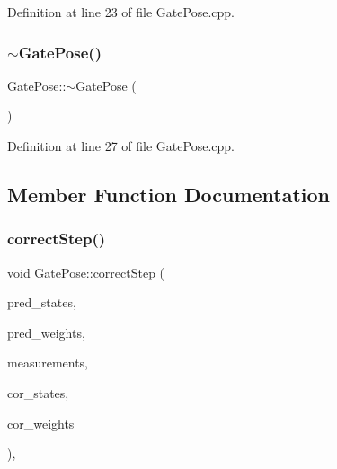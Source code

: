 Definition at line 23 of file Gate\+Pose.\+cpp.

\mbox{\label{classGatePose_acea85773116a379f108b7c53152d9420}} 
\subsubsection{\texorpdfstring{$\sim$\+Gate\+Pose()}{~GatePose()}}
{\footnotesize\ttfamily Gate\+Pose\+::$\sim$\+Gate\+Pose (\begin{DoxyParamCaption}{ }\end{DoxyParamCaption})\hspace{0.3cm}{\ttfamily [noexcept]}}



Definition at line 27 of file Gate\+Pose.\+cpp.



\subsection{Member Function Documentation}
\mbox{\label{classGatePose_a91d395abe75dc7772116f50219dc19ae}} 
\subsubsection{\texorpdfstring{correct\+Step()}{correctStep()}}
{\footnotesize\ttfamily void Gate\+Pose\+::correct\+Step (\begin{DoxyParamCaption}\item[{const Eigen\+::\+Ref$<$ const Eigen\+::\+Matrix\+Xf $>$ \&}]{pred\+\_\+states,  }\item[{const Eigen\+::\+Ref$<$ const Eigen\+::\+Vector\+Xf $>$ \&}]{pred\+\_\+weights,  }\item[{cv\+::\+Input\+Array}]{measurements,  }\item[{Eigen\+::\+Ref$<$ Eigen\+::\+Matrix\+Xf $>$}]{cor\+\_\+states,  }\item[{Eigen\+::\+Ref$<$ Eigen\+::\+Vector\+Xf $>$}]{cor\+\_\+weights }\end{DoxyParamCaption})\hspace{0.3cm}{\ttfamily [override]}, {\ttfamily [protected]}}



